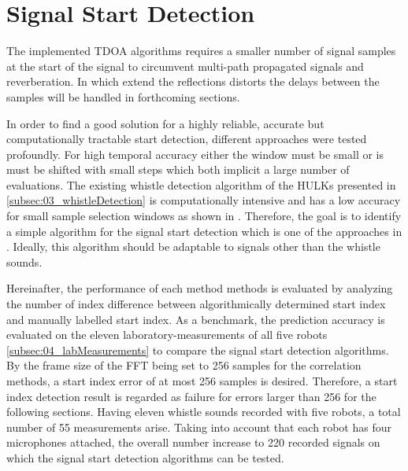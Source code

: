\section{Signal Start Detection}
\label{sec:04_signalStartDetection}

The implemented \ac{TDOA} algorithms requires a smaller number of signal samples
at the start of the signal to circumvent multi-path propagated signals and reverberation.
In which extend the reflections distorts the delays between the samples
will be handled in forthcoming sections.


In order to find a good solution for a highly reliable, accurate but
computationally tractable start detection, different approaches were
tested profoundly.
For high temporal accuracy either the window must be small or is must
be shifted with small steps which both implicit a large number of evaluations.
The existing whistle detection algorithm of the HULKs presented in
\cref{subsec:03_whistleDetection} is computationally intensive and has a low
accuracy for small sample selection windows as shown in \label{subsec:04_whistleDetection}.
Therefore, the goal is to identify a simple algorithm for
the signal start detection which is one of the approaches in .
Ideally, this algorithm should be adaptable to signals other than the whistle sounds.

Hereinafter, the performance of each method methods is evaluated by
analyzing the number of index difference between algorithmically determined start index
and manually labelled start index.
As a benchmark, the prediction accuracy is evaluated on the eleven laboratory-measurements
of all five robots \cref{subsec:04_labMeasurements} to compare the signal start detection algorithms.
By the frame size of the \ac{FFT} being set to 256 samples for the
correlation methods, a start index error of at most 256 samples is
desired.
Therefore, a start index detection result is regarded as failure for errors
larger than 256 for the following sections.
Having eleven whistle sounds recorded with five robots, a total number
of 55 measurements arise.
Taking into account that each robot has four microphones attached,
the overall number increase to 220 recorded signals on which the signal start detection
algorithms can be tested.

